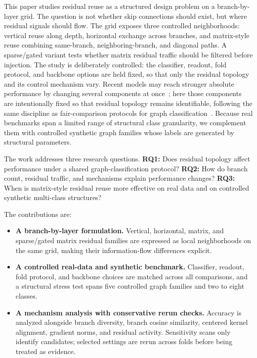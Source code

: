 This paper studies residual reuse as a structured design problem on a
branch-by-layer grid. The question is not whether skip connections should exist,
but where residual signals should flow. The grid exposes three controlled
neighborhoods: vertical reuse along depth, horizontal exchange across branches,
and matrix-style reuse combining same-branch, neighboring-branch, and diagonal
paths. A sparse/gated variant tests whether matrix residual traffic should be
filtered before injection. The study is deliberately controlled: the classifier,
readout, fold protocol, and backbone options are held fixed, so that only the
residual topology and its control mechanism vary. Recent models may reach
stronger absolute performance by changing several components at
once~\cite{du2024densegnn}; here those components are intentionally fixed so
that residual topology remains identifiable, following the same discipline as
fair-comparison protocols for graph
classification~\cite{errica2020fair,morris2020tudataset}. Because real
benchmarks span a limited range of structural class granularity, we complement
them with controlled synthetic graph families whose labels are generated by
structural parameters.

The work addresses three research questions. \textbf{RQ1:} Does residual
topology affect performance under a shared graph-classification protocol?
\textbf{RQ2:} How do branch count, residual traffic, and mechanisms explain
performance changes? \textbf{RQ3:} When is matrix-style residual reuse more
effective on real data and on controlled synthetic multi-class structures?

The contributions are:
\begin{itemize}
\item \textbf{A branch-by-layer formulation.} Vertical, horizontal, matrix, and
sparse/gated matrix residual families are expressed as local neighborhoods on
the same grid, making their information-flow differences explicit.
\item \textbf{A controlled real-data and synthetic benchmark.} Classifier,
readout, fold protocol, and backbone choices are matched across all
comparisons, and a structural stress test spans five controlled graph families
and two to eight classes.
\item \textbf{A mechanism analysis with conservative rerun checks.} Accuracy is
analyzed alongside branch diversity, branch cosine similarity, centered kernel
alignment, gradient norms, and residual activity. Sensitivity scans only
identify candidates; selected settings are rerun across folds before being
treated as evidence.
\end{itemize}
